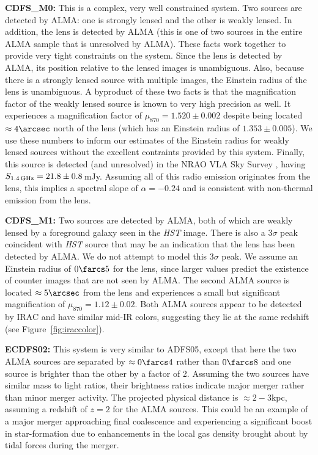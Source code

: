 \documentclass[iop]{emulateapj}
\begin{document}
{\bf CDFS\_M0:} This is a complex, very well constrained system.  Two sources
are detected by ALMA: one is strongly lensed and the other is weakly lensed.
In addition, the lens is detected by ALMA (this is one of two sources in the
entire ALMA sample that is unresolved by ALMA).  These facts work together to
provide very tight constraints on the system.  Since the lens is detected by
ALMA, its position relative to the lensed images is unambiguous.  Also, because
there is a strongly lensed source with multiple images, the Einstein radius of
the lens is unambiguous.  A byproduct of these two facts is that the
magnification factor of the weakly lensed source is known to very high
precision as well.  It experiences a magnification factor of $\mu_{870} =
1.520\pm0.002$ despite being located $\approx4\arcsec$ north of the lens (which
has an Einstein radius of $1.353\pm0.005$).  We use these numbers to inform our
estimates of the Einstein radius for weakly lensed sources without the
excellent contraints provided by this system.  Finally, this source is detected
(and unresolved) in the NRAO VLA Sky Survey \citep{Condon:1998uq}, having
$S_{\rm 1.4\,GHz} = 21.8 \pm 0.8\,$mJy.  Assuming all of this radio emission
originates from the lens, this implies a spectral slope of $\alpha = -0.24$ and
is consistent with non-thermal emission from the lens.

{\bf CDFS\_M1:} Two sources are detected by ALMA, both of which are weakly
lensed by a foreground galaxy seen in the {\it HST} image.  There is also a
3$\sigma$ peak coincident with {\it HST} source that may be an indication that
the lens has been detected by ALMA.  We do not attempt to model this 3$\sigma$
peak.  We assume an Einstein radius of $0\farcs5$ for the lens, since larger
values predict the existence of counter images that are not seen by ALMA.  The
second ALMA source is located $\approx5\arcsec$ from the lens and experiences a
small but significant magnification of $\mu_{870} = 1.12 \pm 0.02$.  Both ALMA
sources appear to be detected by IRAC and have similar mid-IR colors, suggesting
they lie at the same redshift (see Figure~\ref{fig:iraccolor}).  

{\bf ECDFS02:} This system is very similar to ADFS05, except that here the two
ALMA sources are separated by $\approx 0\farcs4$ rather than $0\farcs8$ and one
source is brighter than the other by a factor of 2.  Assuming the two sources
have similar mass to light ratios, their brightness ratios indicate major
merger rather than minor merger activity.  The projected physical distance is
$\approx 2-3$kpc, assuming a redshift of $z=2$ for the ALMA sources.  This
could be an example of a major merger approaching final coalescence and
experiencing a significant boost in star-formation due to enhancements in the
local gas density brought about by tidal forces during the merger.
\end{document}
